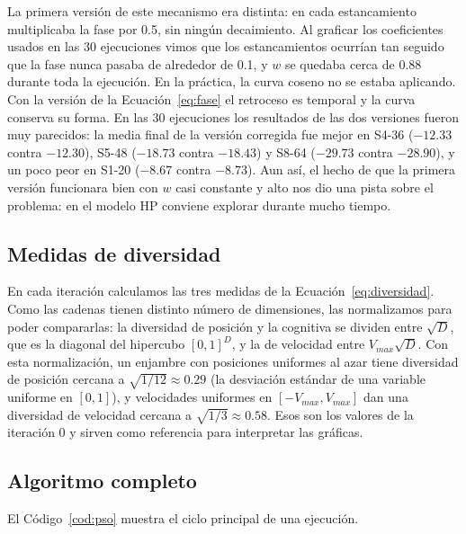 La primera versión de este mecanismo era distinta: en cada estancamiento multiplicaba la fase por 0.5, sin ningún decaimiento. Al graficar los coeficientes usados en las 30 ejecuciones vimos que los estancamientos ocurrían tan seguido que la fase nunca pasaba de alrededor de 0.1, y $w$ se quedaba cerca de 0.88 durante toda la ejecución. En la práctica, la curva coseno no se estaba aplicando. Con la versión de la Ecuación~\eqref{eq:fase} el retroceso es temporal y la curva conserva su forma. En las 30 ejecuciones los resultados de las dos versiones fueron muy parecidos: la media final de la versión corregida fue mejor en S4-36 ($-12.33$ contra $-12.30$), S5-48 ($-18.73$ contra $-18.43$) y S8-64 ($-29.73$ contra $-28.90$), y un poco peor en S1-20 ($-8.67$ contra $-8.73$). Aun así, el hecho de que la primera versión funcionara bien con $w$ casi constante y alto nos dio una pista sobre el problema: en el modelo HP conviene explorar durante mucho tiempo.

\subsection{Medidas de diversidad}
\label{sec:diversidad_impl}

En cada iteración calculamos las tres medidas de la Ecuación~\eqref{eq:diversidad}. Como las cadenas tienen distinto número de dimensiones, las normalizamos para poder compararlas: la diversidad de posición y la cognitiva se dividen entre $\sqrt{D}$, que es la diagonal del hipercubo $[0,1]^D$, y la de velocidad entre $V_{max}\sqrt{D}$. Con esta normalización, un enjambre con posiciones uniformes al azar tiene diversidad de posición cercana a $\sqrt{1/12} \approx 0.29$ (la desviación estándar de una variable uniforme en $[0,1]$), y velocidades uniformes en $[-V_{max}, V_{max}]$ dan una diversidad de velocidad cercana a $\sqrt{1/3} \approx 0.58$. Esos son los valores de la iteración 0 y sirven como referencia para interpretar las gráficas.

\subsection{Algoritmo completo}

El Código~\ref{cod:pso} muestra el ciclo principal de una ejecución.

